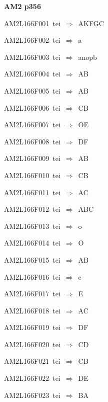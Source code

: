 \par\vfill\eject
{\bf\hfill AM2 p356\hfill\hbox{}}\par\bigskip
{\sixrm AM2L166F001\ {\sixit tei}\ }$\Rightarrow$\ AKFGC\par\smallskip
{\sixrm AM2L166F002\ {\sixit tei}\ }$\Rightarrow$\ {\tenit a}\par\smallskip
{\sixrm AM2L166F003\ {\sixit tei}\ }$\Rightarrow$\ {\tenit anopb}\par\smallskip
{\sixrm AM2L166F004\ {\sixit tei}\ }$\Rightarrow$\ AB\par\smallskip
{\sixrm AM2L166F005\ {\sixit tei}\ }$\Rightarrow$\ AB\par\smallskip
{\sixrm AM2L166F006\ {\sixit tei}\ }$\Rightarrow$\ CB\par\smallskip
{\sixrm AM2L166F007\ {\sixit tei}\ }$\Rightarrow$\ OE\par\smallskip
{\sixrm AM2L166F008\ {\sixit tei}\ }$\Rightarrow$\ DF\par\smallskip
{\sixrm AM2L166F009\ {\sixit tei}\ }$\Rightarrow$\ AB\par\smallskip
{\sixrm AM2L166F010\ {\sixit tei}\ }$\Rightarrow$\ CB\par\smallskip
{\sixrm AM2L166F011\ {\sixit tei}\ }$\Rightarrow$\ AC\par\smallskip
{\sixrm AM2L166F012\ {\sixit tei}\ }$\Rightarrow$\ ABC\par\smallskip
{\sixrm AM2L166F013\ {\sixit tei}\ }$\Rightarrow$\ {\tenit o}\par\smallskip
{\sixrm AM2L166F014\ {\sixit tei}\ }$\Rightarrow$\ O\par\smallskip
{\sixrm AM2L166F015\ {\sixit tei}\ }$\Rightarrow$\ AB\par\smallskip
{\sixrm AM2L166F016\ {\sixit tei}\ }$\Rightarrow$\ {\tenit e}\par\smallskip
{\sixrm AM2L166F017\ {\sixit tei}\ }$\Rightarrow$\ E\par\smallskip
{\sixrm AM2L166F018\ {\sixit tei}\ }$\Rightarrow$\ AC\par\smallskip
{\sixrm AM2L166F019\ {\sixit tei}\ }$\Rightarrow$\ DF\par\smallskip
{\sixrm AM2L166F020\ {\sixit tei}\ }$\Rightarrow$\ CD\par\smallskip
{\sixrm AM2L166F021\ {\sixit tei}\ }$\Rightarrow$\ CB\par\smallskip
{\sixrm AM2L166F022\ {\sixit tei}\ }$\Rightarrow$\ DE\par\smallskip
{\sixrm AM2L166F023\ {\sixit tei}\ }$\Rightarrow$\ BA\par\smallskip

